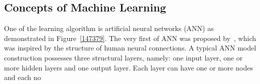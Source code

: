 \subsection{Concepts of Machine Learning}
One of the learning algorithm is artificial neural networks (ANN) as demonstrated in Figure~\ref{147379}. The very first of ANN was proposed by~\citet{McCulloch_1943}, which was inspired by the structure of human neural connections. A typical ANN model construction possesses three structural layers, namely: one input layer, one or more hidden layers and one output layer. Each layer can have one or more nodes and each no